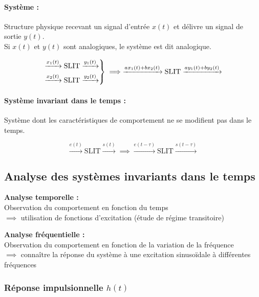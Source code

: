 \documentclass[a4paper,12pt]{article}
\begin{document}
\begin{defi}
    \paragraph{Système :} Structure physique recevant un signal d'entrée $x(t)$ et délivre un signal de sortie $y(t)$. \\
    Si $x(t)$ et $y(t)$ sont analogiques, le système est dit analogique.

    \[ \begin{rcases}
        \xrightarrow{x_1(t)} \mathrm{SLIT} \xrightarrow{y_1(t)} \\
        \xrightarrow{x_2(t)} \mathrm{SLIT} \xrightarrow{y_2(t)}
    \end{rcases} \implies \xrightarrow{ax_1(t) + bx_2(t)} \mathrm{SLIT} \xrightarrow{ay_1(t) + by_2(t)}\]

    \paragraph{Système invariant dans le temps :} Système dont les caractéristiques de comportement ne se modifient pas dans le temps.

    \[ \xrightarrow{e(t)} \mathrm{SLIT} \xrightarrow{s(t)} \implies \xrightarrow{e(t-\tau)} \mathrm{SLIT} \xrightarrow{s(t-\tau)} \]
\end{defi}

\subsection{Analyse des systèmes invariants dans le temps}

\textbf{Analyse temporelle :} \\
Observation du comportement en fonction du temps \\
$\implies$ utilisation de fonctions d'excitation (étude de régime transitoire)

\textbf{Analyse fréquentielle :} \\
Observation du comportement en fonction de la variation de la fréquence \\
$\implies$ connaître la réponse du système à une excitation sinusoïdale à différentes fréquences

\subsubsection{Réponse impulsionnelle $h(t)$}
\end{document}
